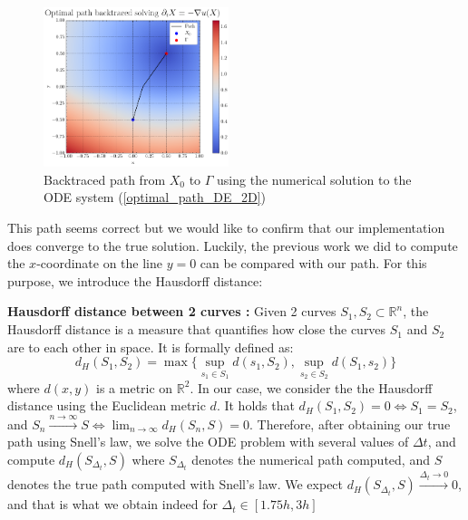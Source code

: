 \documentclass[11pt]{article}
\theoremstyle{definition}
\theoremstyle{remark}
\newcommand{\R}{\mathbb{R}}
\begin{document}
\begin{figure}[h]
  \centering
  \includegraphics[width=0.48\textwidth]{plots/snell_path.png}
  \caption{Backtraced path from $X_0$ to $\Gamma$ using the numerical solution to the ODE system (\ref{optimal_path_DE_2D})}
  \label{fig:snell_path}
\end{figure}

\FloatBarrier

\noindent This path seems correct but we would like to confirm that our implementation does converge to the true solution. Luckily, the previous work we did to compute the $x$-coordinate on the line $y=0$ can be compared with our path. For this purpose, we introduce the Hausdorff distance: \\

\vspace{5pt}

\noindent\textbf{Hausdorff distance between 2 curves :} Given 2 curves $S_1,S_2\subset \mathbb{R}^n$, the Hausdorff distance is a measure that quantifies how close the curves $S_1$ and $S_2$ are to each other in space. It is formally defined as: 
\begin{equation*}
    d_H(S_1,S_2)=\max\{\sup_{s_1\in S_1}d(s_1,S_2),\sup_{s_2\in S_2}d(S_1,s_2)\}
\end{equation*}
where $d(x,y)$ is a metric on $\R^2$. In our case, we consider the the Hausdorff distance using the Euclidean metric $d$. It holds that $d_H(S_1,S_2)=0\iff S_1=S_2$, and $S_n\xrightarrow{n\to\infty}S\iff\lim_{n\to\infty}d_H(S_n,S)=0$.
Therefore, after obtaining our true path using Snell's law, we solve the ODE problem with several values of $\Delta t$, and compute $d_H(S_{\Delta_t},S)$ where $S_{\Delta_t}$ denotes the numerical path computed, and $S$ denotes the true path computed with Snell's law. We expect $d_H(S_{\Delta_t},S)\xrightarrow{\Delta_t\to0}0$, and that is what we obtain indeed for $\Delta_t\in[1.75h,3h]$ \\
\end{document}
